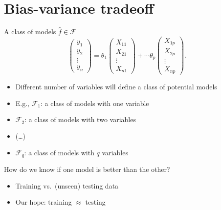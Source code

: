 \documentclass[
  ignorenonframetext,
  aspectratio=169]{beamer}
\begin{document}
\hypertarget{bias-variance-tradeoff}{%
\section{Bias-variance tradeoff}\label{bias-variance-tradeoff}}

\begin{frame}{A class of models \(\hat{f} \in \mathcal{F}\)}
\protect\hypertarget{a-class-of-models-hatf-in-mathcalf}{}
\[
\left(\begin{array}{l}
y_{1}\\
y_{2}\\
\vdots\\
y_{n}
\end{array}\right)
=
\theta_{1} \left(\begin{array}{l}
X_{11}\\
X_{21}\\
\vdots\\
X_{n1}
\end{array}\right) +
\cdots
\theta_{p} \left(\begin{array}{l}
X_{1p}\\
X_{2p}\\
\vdots\\
X_{np}
\end{array}\right).
\]

\begin{itemize}
\item
  Different number of variables will define a class of potential models
\item
  E.g., \(\mathcal{F}_{1}\): a class of models with one variable
\item
  \(\mathcal{F}_{2}\): a class of models with two variables
\item
  (\ldots)
\item
  \(\mathcal{F}_{q}\): a class of models with \(q\) variables
\end{itemize}
\end{frame}

\begin{frame}{How do we know if one model is better than the other?}
\protect\hypertarget{how-do-we-know-if-one-model-is-better-than-the-other}{}
\large

\begin{itemize}
\item
  Training vs.~(unseen) testing data
\item
  Our hope: training \(\approx\) testing
\end{itemize}
\end{frame}
\end{document}
